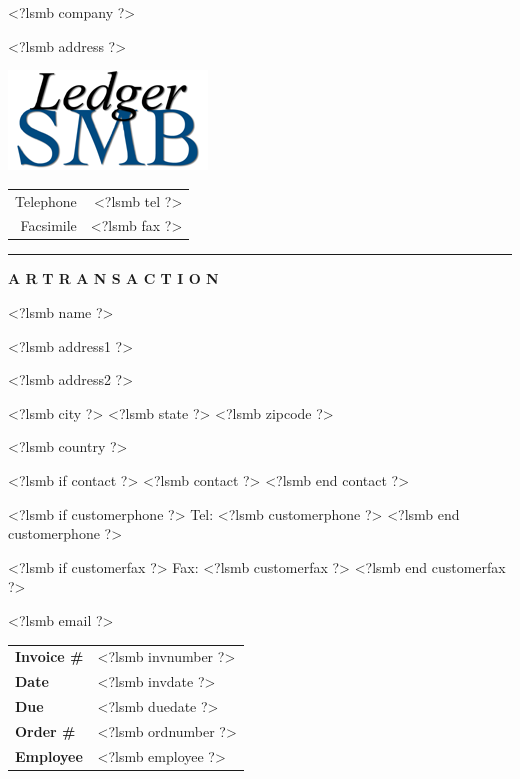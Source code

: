 \documentclass{scrartcl}
\begin{document}
\pagestyle{myheadings}
\thispagestyle{empty}

\fontsize{10pt}{12pt}\selectfont

\vspace*{-1.3cm}

\parbox{\textwidth}{%
  \parbox[b]{.42\textwidth}{%
    <?lsmb company ?>
   
    <?lsmb address ?>
  }
  \parbox[b]{.2\textwidth}{
    \includegraphics[scale=0.3]{ledger-smb}
  }\hfill
  \begin{tabular}[b]{rr@{}}
  Telephone & <?lsmb tel ?>\\
  Facsimile & <?lsmb fax ?>
  \end{tabular}

  \rule[1.5em]{\textwidth}{0.5pt}
}

\centerline{\textbf{A R} \hspace{0.3cm} \textbf{T R A N S A C T I O N}}

\vspace*{0.5cm}

\parbox[t]{.5\textwidth}{
<?lsmb name ?>

<?lsmb address1 ?>

<?lsmb address2 ?>

<?lsmb city ?> <?lsmb state ?> <?lsmb zipcode ?>

<?lsmb country ?>

\vspace{0.3cm}

<?lsmb if contact ?>
<?lsmb contact ?>
<?lsmb end contact ?>

\vspace{0.2cm}

<?lsmb if customerphone ?>
Tel: <?lsmb customerphone ?>
<?lsmb end customerphone ?>

<?lsmb if customerfax ?>
Fax: <?lsmb customerfax ?>
<?lsmb end customerfax ?>

<?lsmb email ?>
}
\hfill
\begin{tabular}[t]{ll}
  \textbf{Invoice \#} & <?lsmb invnumber ?> \\
  \textbf{Date} & <?lsmb invdate ?> \\
  \textbf{Due} & <?lsmb duedate ?> \\
  \textbf{Order \#} & <?lsmb ordnumber ?> \\
  \textbf{Employee} & <?lsmb employee ?> \\
\end{tabular}
\end{document}
